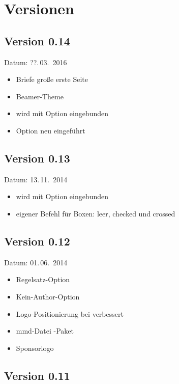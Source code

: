 
\cleardoublepage
\section{Versionen}

\subsection{Version 0.14}

Datum: ??.\,03.~2016

\begin{itemize}
	\item Briefe große erste Seite
	\item Beamer-Theme
	\item {} wird mit Option  eingebunden
	\item Option  neu eingeführt
\end{itemize}

\subsection{Version 0.13}

Datum: 13.\,11.~2014

\begin{itemize}
	\item {} wird mit Option  eingebunden
	\item eigener Befehl  für Boxen: leer, checked und crossed
\end{itemize}

\subsection{Version 0.12}

Datum: 01.\,06.~2014

\begin{itemize}
	\item Regelsatz-Option 
	\item Kein-Author-Option 
	\item Logo-Positionierung bei  verbessert
	\item mmd-Datei -Paket
	\item Sponsorlogo
\end{itemize}

\subsection{Version 0.11}


